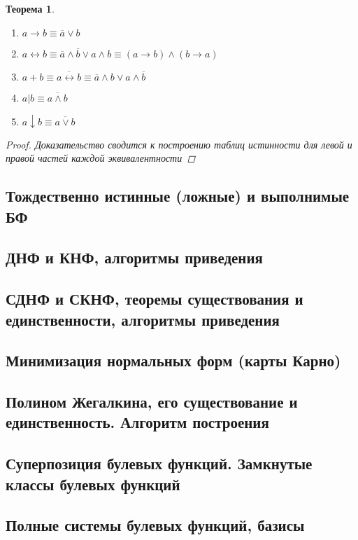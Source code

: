 \documentclass[a4paper]{article}
\newtheorem{theorem}{Теорема}[section]
\theoremstyle{definition}
\theoremstyle{remark}
\begin{document}
\begin{theorem}
\begin{enumerate}
			\item $a \rightarrow b \equiv \overline{a} \vee b$
			\item $a \leftrightarrow b \equiv \overline{a} \wedge \overline{b} \vee a \wedge b \equiv (a \rightarrow b) \wedge (b \rightarrow a)$
			\item $a + b \equiv \overline{a \leftrightarrow b} \equiv \overline{a} \wedge b \vee a \wedge \overline{b}$
			\item $a | b \equiv \overline{a \wedge b}$
			\item $a \downarrow b \equiv \overline{a \vee b}$
		\end{enumerate}
		\begin{proof}
			Доказательство сводится к построению таблиц истинности для левой и правой частей каждой эквивалентности
		\end{proof}
	\end{theorem}
    \subsection{Тождественно истинные (ложные) и выполнимые БФ}
    \subsection{ДНФ и КНФ, алгоритмы приведения}
    \subsection{СДНФ и СКНФ, теоремы существования и единственности, алгоритмы приведения}
    \subsection{Минимизация нормальных форм (карты Карно)}
    \subsection{Полином Жегалкина, его существование и единственность. Алгоритм построения}
    \subsection{Суперпозиция булевых функций. Замкнутые классы булевых функций}
    \subsection{Полные системы булевых функций, базисы}
\end{document}
